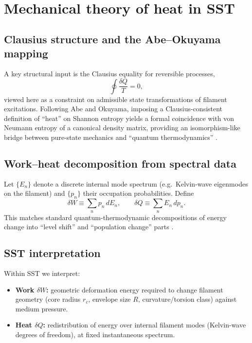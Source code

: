 \documentclass[pdflatex,sn-mathphys-num]{revtex4-2}
\providecommand{\rc}{r_c}
\begin{document}
    \section{Mechanical theory of heat in SST}

    \subsection{Clausius structure and the Abe--Okuyama mapping}
        A key structural input is the Clausius equality for reversible processes,
        \begin{equation}
            \oint \frac{\delta Q}{T} = 0,
            \label{eq:clausius}
        \end{equation}
        viewed here as a constraint on admissible state transformations of filament excitations.
        Following Abe and Okuyama, imposing a Clausius-consistent definition of ``heat'' on Shannon entropy yields a
        formal coincidence with von Neumann entropy of a canonical density matrix, providing an isomorphism-like bridge
        between pure-state mechanics and ``quantum thermodynamics'' \cite{AbeOkuyama2011PRE,AbeOkuyama2010arXiv}.

    \subsection{Work--heat decomposition from spectral data}
        Let \(\{E_n\}\) denote a discrete internal mode spectrum (e.g.\ Kelvin-wave eigenmodes on the filament) and
        \(\{p_n\}\) their occupation probabilities.
        Define
        \begin{equation}
            \delta W \equiv \sum_n p_n\, dE_n,\qquad
            \delta Q \equiv \sum_n E_n\, dp_n.
            \label{eq:WQsplit}
        \end{equation}
        This matches standard quantum-thermodynamic decompositions of energy change into ``level shift'' and
        ``population change'' parts \cite{AbeOkuyama2011PRE}.

    \subsection{SST interpretation}
        Within SST we interpret:
        \begin{itemize}
            \item \textbf{Work \(\delta W\):} geometric deformation energy required to change filament geometry
            (core radius \(\rc\), envelope size \(R\), curvature/torsion class) against medium pressure.
            \item \textbf{Heat \(\delta Q\):} redistribution of energy over internal filament modes (Kelvin-wave degrees of freedom),
            at fixed instantaneous spectrum.
        \end{itemize}
\end{document}
